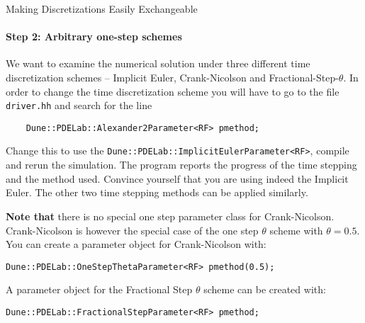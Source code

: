 \documentclass[12pt,a4paper]{article}
\begin{document}
\begin{Exercise}{Making Discretizations Easily Exchangeable}
  \paragraph{Step 2: Arbitrary one-step schemes}
  We want to examine the numerical solution under three different time
  discretization schemes -- Implicit Euler, Crank-Nicolson and
  Fractional-Step-$\theta$. In order to change the time discretization
  scheme you will have to go to the file \lstinline!driver.hh! and
  search for the line
  \begin{lstlisting}
    Dune::PDELab::Alexander2Parameter<RF> pmethod;
  \end{lstlisting}
  Change this to use the
  \lstinline!Dune::PDELab::ImplicitEulerParameter<RF>!, compile and
  rerun the simulation. The program reports the progress of the time
  stepping and the method used. Convince yourself that you are using
  indeed the Implicit Euler. The other two time stepping methods can be
  applied similarly.

  \textbf{Note that} there is no special one step parameter class for
  Crank-Nicolson.  Crank-Nicolson is however the special case of the one
  step $\theta$ scheme with $\theta=0.5$.  You can create a parameter
  object for Crank-Nicolson with:
  \begin{lstlisting}
Dune::PDELab::OneStepThetaParameter<RF> pmethod(0.5);
  \end{lstlisting}

  A parameter object for the Fractional Step $\theta$ scheme can be created
  with:
  \begin{lstlisting}
Dune::PDELab::FractionalStepParameter<RF> pmethod;
  \end{lstlisting}


\end{Exercise}
\end{document}
